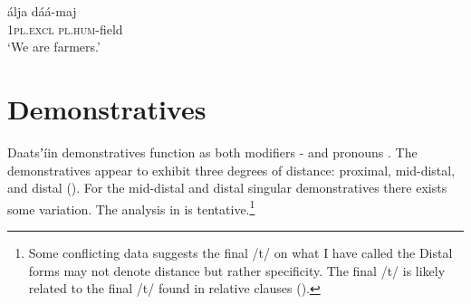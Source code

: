 \documentclass[output=paper]{langsci/langscibook}
\begin{document}
\ex\label{ex:ahlandc:55b}
\gll
álja             dáá-maj \\
  1\textsc{pl.excl}   \textsc{pl.hum}{}-field\\
  \glt
  ‘We are farmers.’
\z 
\z


\begin{table}
\caption{Pronominal NN constructions with derived nouns}
\label{tab:ahlandc:10}
\end{table}

\section{Demonstratives}\label{sec:ahlandc:9}

Daatsʼíin demonstratives function as both modifiers - and pronouns . The demonstratives appear to exhibit three degrees of distance: proximal, mid-distal, and distal (). For the mid-distal and distal singular demonstratives there exists some variation. The analysis in  is tentative.\footnote{Some conflicting data suggests the final /t/ on what I have called the Distal forms may not denote distance but rather specificity. The final /t/ is likely related to the final /t/ found in relative clauses ().}
\end{document}
